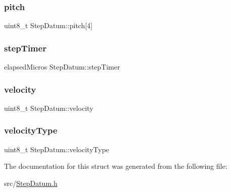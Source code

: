 \subsubsection{\texorpdfstring{pitch}{pitch}}
{\footnotesize\ttfamily uint8\+\_\+t Step\+Datum\+::pitch\mbox{[}4\mbox{]}}

\mbox{\label{struct_step_datum_ac12223e4eb5ad5888e79eac17cf2c3da}} 
\subsubsection{\texorpdfstring{step\+Timer}{stepTimer}}
{\footnotesize\ttfamily elapsed\+Micros Step\+Datum\+::step\+Timer}

\mbox{\label{struct_step_datum_a84adb7c8fcc48652b0e2f31e71af0d63}} 
\subsubsection{\texorpdfstring{velocity}{velocity}}
{\footnotesize\ttfamily uint8\+\_\+t Step\+Datum\+::velocity}

\mbox{\label{struct_step_datum_ad6e4e79031428052d5ca7460ebcc6e0d}} 
\subsubsection{\texorpdfstring{velocity\+Type}{velocityType}}
{\footnotesize\ttfamily uint8\+\_\+t Step\+Datum\+::velocity\+Type}



The documentation for this struct was generated from the following file\+:\begin{DoxyCompactItemize}
\item 
src/\hyperlink{_step_datum_8h}{Step\+Datum.\+h}\end{DoxyCompactItemize}
